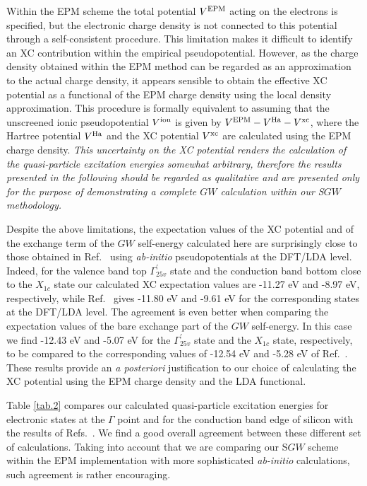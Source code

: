 \documentclass[twocolumn,prb,showpacs,superscriptaddress]{revtex4}
\begin{document}
Within the EPM scheme the total potential $V^{\rm EPM}$ acting on the electrons is specified,\cite{cohen_berg}
but the electronic charge density is not connected to this potential
through a self-consistent procedure.\cite{appelbaum}
This limitation makes it difficult to identify an XC contribution within the empirical
pseudopotential. However, as the charge density obtained within the EPM method can be regarded 
as an approximation to the actual charge density,\cite{EPM-density}
it appears sensible to obtain the effective XC potential
as a functional of the EPM charge density
using the local density approximation.\cite{lda1,lda2}
This procedure is formally equivalent to assuming that the unscreened ionic pseudopotential
$V^{\rm ion}$ is given by $V^{\rm EPM} - V^{\rm Ha} - V^{\rm xc}$, where
the Hartree potential $V^{\rm Ha}$ and the XC potential $V^{\rm xc}$ are calculated using the EPM charge density.
%
{\it 
This uncertainty on the XC potential renders the calculation of the quasi-particle
excitation energies somewhat arbitrary, therefore the results presented in the following
should be regarded as qualitative and are presented only for the purpose of demonstrating 
a complete $GW$  calculation within our S$GW$ methodology.
}

Despite the above limitations, the expectation values of the
XC potential and of the exchange term of the $GW$ self-energy calculated here are surprisingly
close to those obtained in Ref.\  using {\it ab-initio} pseudopotentials
at the DFT/LDA level. Indeed, for the valence band top 
$\Gamma_{25v}^\prime$ state and the conduction band bottom close to the $X_{1c}$ state
our calculated XC expectation values are -11.27 eV and -8.97 eV, respectively,
while Ref.\  gives -11.80 eV and -9.61 eV for the corresponding states
at the DFT/LDA level. The agreement is even better when comparing the expectation values
of the bare exchange part of the $GW$ self-energy. In this case we find -12.43 eV and -5.07 eV
for the $\Gamma_{25v}^\prime$ state and the $X_{1c}$ state, respectively, to be compared
to the corresponding values of -12.54 eV and -5.28 eV of Ref.~.
These results provide an {\it a posteriori} justification to our choice of calculating
the XC potential using the EPM charge density and the LDA functional.

Table \ref{tab.2} compares our
calculated quasi-particle excitation energies for electronic states at the $\Gamma$ 
point and for the conduction band edge of silicon with the results of Refs.\ .
We find a good overall agreement between these different set of calculations.
Taking into account that we are comparing our S$GW$ scheme
within the EPM implementation with more sophisticated {\it ab-initio} calculations,
such agreement is rather encouraging.
\end{document}
